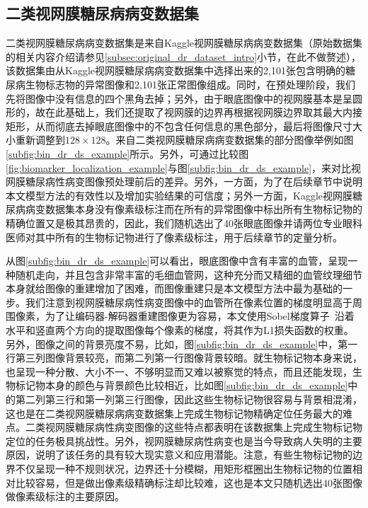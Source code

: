 \subsection{二类视网膜糖尿病病变数据集}\label{subsec:bin_dr_ds}
二类视网膜糖尿病病变数据集是来自Kaggle视网膜糖尿病病变数据集（原始数据集的相关内容介绍请参见\ref{subsec:original_dr_dataset_intro}小节，在此不做赘述），该数据集由从Kaggle视网膜糖尿病病变数据集中选择出来的2,101张包含明确的糖尿病生物标志物的异常图像和2,101张正常图像组成。同时，在预处理阶段，我们先将图像中没有信息的四个黑角去掉；另外，由于眼底图像中的视网膜基本是呈圆形的，故在此基础上，我们还提取了视网膜的边界再根据视网膜边界取其最大内接矩形，从而彻底去掉眼底图像中的不包含任何信息的黑色部分，最后将图像尺寸大小重新调整到$128\times 128$。来自二类视网膜糖尿病病变数据集的部分图像举例如图\ref{subfig:bin_dr_ds_example}所示。另外，可通过比较图\ref{fig:biomarker_localization_example}与图\ref{subfig:bin_dr_ds_example}，来对比视网膜糖尿病性病变图像预处理前后的差异。另外，一方面，为了在后续章节中说明本文模型方法的有效性以及增加实验结果的可信度；另外一方面，Kaggle视网膜糖尿病病变数据集本身没有像素级标注而在所有的异常图像中标出所有生物标记物的精确位置又是极其昂贵的，因此，我们随机选出了40张眼底图像并请两位专业眼科医师对其中所有的生物标记物进行了像素级标注，用于后续章节的定量分析。

从图\ref{subfig:bin_dr_ds_example}可以看出，眼底图像中含有丰富的血管，呈现一种随机走向，并且包含非常丰富的毛细血管网，这种充分而又精细的血管纹理细节本身就给图像的重建增加了困难，而图像重建只是本文模型方法中最为基础的一步。我们注意到视网膜糖尿病性病变图像中的血管所在像素位置的梯度明显高于周围像素，为了让编码器-解码器重建图像更为容易，本文使用Sobel梯度算子~\cite{sobel2014history}沿着水平和竖直两个方向的提取图像每个像素的梯度，将其作为L1损失函数的权重。另外，图像之间的背景亮度不易，比如，图\ref{subfig:bin_dr_ds_example}中，第一行第三列图像背景较亮，而第二列第一行图像背景较暗。就生物标记物本身来说，也呈现一种分散、大小不一、不够明显而又难以被察觉的特点，而且还能发现，生物标记物本身的颜色与背景颜色比较相近，比如图\ref{subfig:bin_dr_ds_example}中的第二列第三行和第一列第三行图像，因此这些生物标记物很容易与背景相混淆，这也是在二类视网膜糖尿病病变数据集上完成生物标记物精确定位任务最大的难点。二类视网膜糖尿病性病变图像的这些特点都表明在该数据集上完成生物标记物定位的任务极具挑战性。另外，视网膜糖尿病性病变也是当今导致病人失明的主要原因，说明了该任务的具有较大现实意义和应用潜能。注意，有些生物标记物的边界不仅呈现一种不规则状况，边界还十分模糊，用矩形框圈出生物标记物的位置相对比较容易，但是做出像素级精确标注却比较难，这也是本文只随机选出40张图像做像素级标注的主要原因。

